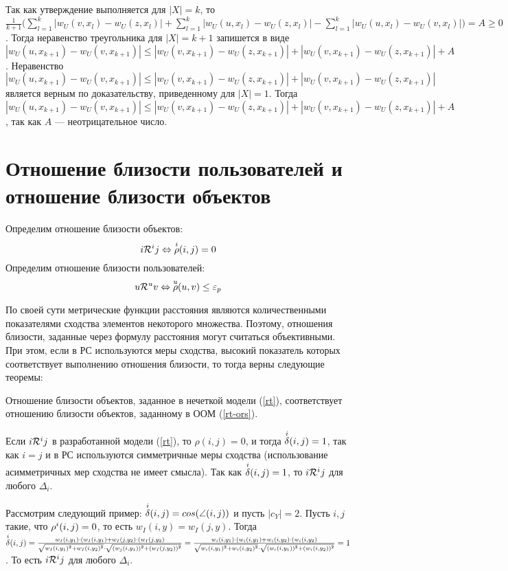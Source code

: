 Так как утверждение выполняется для $|X| = k$, то\\
$\frac{1}{k+1} \Big(\sum \limits_{l=1}^{k} |w_U(v,x_l) - w_U(z,x_l)| + \sum \limits_{l=1}^{k} |w_U(u,x_l) - w_U(z,x_l)| -
\sum \limits_{l=1}^{k} |w_U(u,x_l) - w_U(v,x_l)|\Big) = A \ge 0$. Тогда неравенство треугольника для $|X| = k + 1$ запишется в виде
$|w_U(u,x_{k+1}) - w_U(v,x_{k+1})| \le |w_U(v,x_{k+1}) - w_U(z,x_{k+1})| + |w_U(v,x_{k+1}) - w_U(z,x_{k+1})| + A$.
Неравенство
$|w_U(u,x_{k+1}) - w_U(v,x_{k+1})| \le |w_U(v,x_{k+1}) - w_U(z,x_{k+1})| +
|w_U(v,x_{k+1}) - w_U(z,x_{k+1})|$ является верным по доказательству,
приведенному для $|X| = 1$.
Тогда $|w_U(u,x_{k+1}) - w_U(v,x_{k+1})| \le |w_U(v,x_{k+1}) - w_U(z,x_{k+1})|
+ |w_U(v,x_{k+1}) - w_U(z,x_{k+1})| + A$, так как $A$ --- неотрицательное число.

\section{Отношение близости пользователей и отношение близости объектов}
Определим отношение близости объектов:
\begin{equation}\label{rt}
  i \mathcal{R}^i j \Leftrightarrow \overset{i}{\rho}(i,j) = 0
\end{equation}
Определим отношение близости пользователей:
\begin{equation}\label{ru}
	u \mathcal{R}^u v \Leftrightarrow \overset{u}{\mathcal{\rho}}(u,v) \le
	\varepsilon_p
\end{equation}

По своей сути метрические функции расстояния являются количественными
показателями сходства элементов некоторого множества. Поэтому, отношения
близости, заданные через формулу расстояния могут считаться объективными.
При этом, если в РС используются меры сходства, высокий показатель которых
соответствует выполнению отношения близости, то тогда верны следующие теоремы:

\begin{trm}
	Отношение близости объектов, заданное в нечеткой модели (\ref{rt}), соответствует
	отношению близости объектов, заданному в ООМ (\ref{rt-ors}).
\end{trm}

Если $i \mathcal{R}^i j$ в разработанной модели (\ref{rt}),
то $\rho(i, j) = 0$, и тогда ${\overset{i}{\mathcal{\delta}}}(i, j) = 1$, так как $i =
j$ и в РС используются симметричные меры сходства (использование
асимметричных мер сходства не имеет смысла). Так как ${\overset{i}{\mathcal{\delta}}}(i, j) =
1$, то $i \mathcal{R}^i j$ для любого $\Delta_i$.

Рассмотрим следующий пример: ${\overset{i}{\mathcal{\delta}}}(i,j) = cos(\angle(i,j))$
и пусть $|c_Y| = 2$. Пусть $i, j$ такие, что ${\mathcal{\rho}}^i(i, j) = 0$, то есть
$w_I(i,y) = w_I(j,y)$. Тогда ${\overset{i}{\mathcal{\delta}}}(i, j) =
\frac{
	w_I(i,y_1) \cdot (w_I(i,y_1) +
	w_I(j,y_2) \cdot (w_I(j,y_2)
	} {
		\sqrt{w_I(i,y_1)^2 + w_I(i,y_2)^2} \cdot
		\sqrt{ (w_j(i,y_1))^2 + (w_I(j,y_2))^2   }
	} =
\frac{
	w_i(i,y_1) \cdot (w_i(i,y_1) +
	w_i(i,y_2) \cdot (w_i(i,y_2)
	} {
		\sqrt{w_i(i,y_1)^2 + w_i(i,y_2)^2} \cdot
		\sqrt{ (w_i(i,y_1))^2 + (w_i(i,y_2))^2   }
	} = 1$.
То есть $i \mathcal{R}^i j$ для любого $\Delta_i$.

